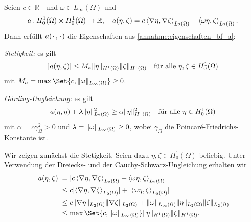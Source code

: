 \begin{Lemma}
\label{lemma:a_bf_bounded_garding}
    Seien $c \in \mathbb{R}_{+}$ und $\omega \in L_{\infty}(\Omega)$ und
    \begin{equation}
    \label{eq:bf_a}
        a \colon H^{1}_{0}(\Omega) \times H^{1}_{0}(\Omega) \to \mathbb{R}, \quad a(\eta, \zeta) = c \left\langle\nabla \eta,\nabla \zeta\right\rangle_{L_{2}(\Omega)} + \left\langle\omega \eta,\zeta\right\rangle_{L_{2}(\Omega)}.
    \end{equation}
    Dann erfüllt $a({\mkern2mu\cdot\mkern2mu}, {\mkern2mu\cdot\mkern2mu})$ die Eigenschaften aus \ref{annahme:eigenschaften_bf_a}:
    \begin{thmenumerate}
        \item\label{lemma:a_bf_bounded_garding:1}
        \emph{Stetigkeit:} es gilt
        \begin{equation}
            \lvert a(\eta, \zeta)\rvert \leq M_{a} \lVert\eta\rVert_{H^{1}(\Omega)} \lVert\zeta\rVert_{H^{1}(\Omega)} \quad \text{für alle}~\eta, \zeta \in H^{1}_{0}(\Omega)
        \end{equation}
        mit $M_{a} = \max\Set{c, \norm{\omega}_{L_{\infty}(\Omega)} } \geq 0$.
        \item\label{lemma:a_bf_bounded_garding:2}
        \emph{G\aa{}rding-Ungleichung:} es gilt
        \begin{equation}
                a(\eta, \eta) + \lambda \lVert\eta\rVert_{L_{2}(\Omega)}^{2} \geq \alpha \lVert\eta\rVert_{H^{1}(\Omega)}^{2} \quad \text{für alle}~\eta \in H^{1}_{0}(\Omega)
        \end{equation}
        mit $\alpha = c \gamma_{\Omega}^{2} > 0$ und $\lambda = \lVert\omega\rVert_{L_{\infty}(\Omega)} \geq 0$, wobei $\gamma_{\Omega}$ die Poincaré-Friedrichs-Konstante ist.
    \end{thmenumerate}

    \begin{Beweis}
    Wir zeigen zunächst die Stetigkeit.
    Seien dazu $\eta, \zeta \in H^{1}_{0}(\Omega)$ beliebig.
    Unter Verwendung der Dreiecks- und der Cauchy-Schwarz-Ungleichung erhalten wir
    \begin{align}
        \abs{a(\eta, \zeta)}
        &= \abs{c \skprod{\grad \eta}{\grad \zeta}_{L_{2}(\Omega)} + \skprod{\omega \eta}{\zeta}_{L_{2}(\Omega)}}
        \\&\leq c \abs{\skprod{\grad \eta}{\grad \zeta}_{L_{2}(\Omega)}} + \abs{\skprod{\omega \eta}{\zeta}_{L_{2}(\Omega)}}
        \\&\leq c \norm{\grad \eta}_{L_{2}(\Omega)} \norm{\grad \zeta}_{L_{2}(\Omega)} + \norm{\omega}_{L_{\infty}(\Omega)} \norm{\eta}_{L_{2}(\Omega)} \norm{\zeta}_{L_{2}(\Omega)}
        \\&\leq \max \Set{ c, \norm{\omega}_{L_{\infty}(\Omega)} } \norm{\eta}_{H^{1}(\Omega)} \norm{\zeta}_{H^{1}(\Omega)}.
    \end{align}


\end{Beweis}
\end{Lemma}
